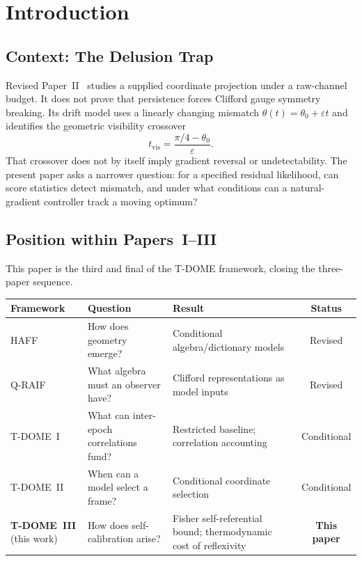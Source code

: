 \documentclass[12pt]{article}
\begin{document}
\section{Introduction}
\label{sec:intro}

\subsection{Context: The Delusion Trap}
\label{subsec:delusion_context}

Revised Paper~II~\cite{Liu2026TDOME_II} studies a supplied
coordinate projection under a raw-channel budget.  It does not prove
that persistence forces Clifford gauge symmetry breaking.  Its drift
model uses a linearly changing mismatch
$\theta(t)=\theta_0+\varepsilon t$ and identifies the geometric
visibility crossover
\begin{equation}
\label{eq:t_del_recall}
t_{\mathrm{vis}}
=\frac{\pi/4-\theta_0}{\varepsilon}.
\end{equation}
That crossover does not by itself imply gradient reversal or
undetectability.  The present paper asks a narrower question: for a
specified residual likelihood, can score statistics detect mismatch,
and under what conditions can a natural-gradient controller track a
moving optimum?

\subsection{Position within Papers~I--III}
\label{subsec:sequence}

This paper is the third and final of the T-DOME framework,
closing the three-paper sequence.

\begin{center}
\small
\setlength{\tabcolsep}{4pt}%
\begin{tabular}{@{}lP{3.5cm}P{4.2cm}c@{}}
\toprule
\textbf{Framework} & \textbf{Question} & \textbf{Result}
  & \textbf{Status} \\
\midrule
HAFF~\cite{Liu2026HAFF_A,Liu2026HAFF_B}
  & How does geometry emerge?
  & Conditional algebra/dictionary models
  & Revised \\[3pt]
Q-RAIF~\cite{Liu2026QRAIF_A,Liu2026QRAIF_B}
  & What algebra must an observer have?
  & Clifford representations as model inputs
  & Revised \\[3pt]
T-DOME~I~\cite{Liu2026TDOME_I}
  & What can inter-epoch correlations fund?
  & Restricted baseline; correlation accounting
  & Conditional \\[3pt]
T-DOME~II~\cite{Liu2026TDOME_II}
  & When can a model select a frame?
  & Conditional coordinate selection
  & Conditional \\[3pt]
\textbf{T-DOME~III} (this work)
  & How does self-calibration arise?
  & Fisher self-referential bound;
    thermodynamic cost of reflexivity
  & \textbf{This paper} \\
\bottomrule
\end{tabular}
\end{center}
\end{document}
